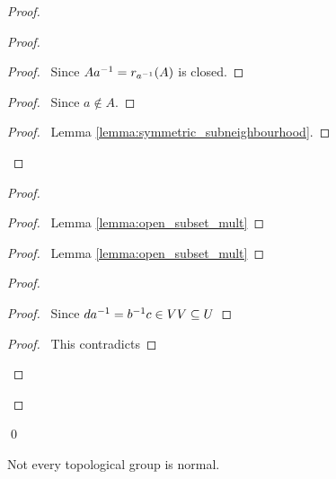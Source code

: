 \begin{proof}
    \pf
    \begin{proof}
        \begin{proof}
            \pf\ Since $A {a}^{-1} = r_{{a}^{-1}}(A)$ is closed.
        \end{proof}
        \begin{proof}
            \pf\ Since $a \notin A$.
        \end{proof}
        \qedstep
        \begin{proof}
            \pf\ Lemma \ref{lemma:symmetric_subneighbourhood}.
        \end{proof}
    \end{proof}
    \begin{proof}
        \begin{proof}
            \pf\ Lemma \ref{lemma:open_subset_mult}
        \end{proof}
        \begin{proof}
            \pf\ Lemma \ref{lemma:open_subset_mult}
        \end{proof}
        \begin{proof}
            \begin{proof}
                \pf\ Since $d {a}^{-1} = {b}^{-1} c \in VV \subseteq U$
            \end{proof}
            \qedstep
            \begin{proof}
                \pf\ This contradicts 
            \end{proof}
        \end{proof}
    \end{proof}
    \qed
\end{proof}

\begin{example}
    Not every topological group is normal.
\end{example}

